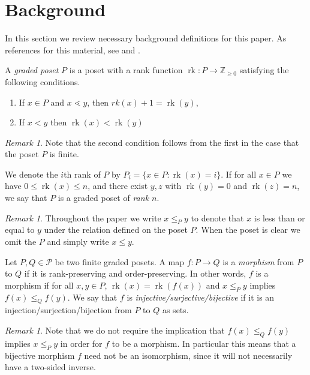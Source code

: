 \documentclass[smallextended, envcountsame, numbook]{svjour3}
\theoremstyle{plain}
\theoremstyle{definition}
\theoremstyle{remark}
\newtheorem{rmk}[thm]{Remark}
\numberwithin{equation}{section}
\newcommand\rk{\operatorname{rk}}
\begin{document}
\section{Background}\label{sec:background}

In this section we review necessary background definitions for this paper.
As references for this material, see
\cite[Chapter 4]{stanley_alg_comb} and \cite{quotients_stanley}.


A {\it graded poset} $P$ is a poset with a rank function $\rk\colon P \rightarrow \mathbb Z_{\geq 0}$ satisfying the following conditions.
\begin{enumerate}
  \item If $x\in P$ and $x\lessdot y$, then $rk(x) + 1 = \rk(y)$,
  \item If $x < y$ then $\rk(x) < \rk(y)$ 
\end{enumerate}

\begin{rmk}
Note that the second condition follows from the first in the case that the poset $P$ is finite.
\end{rmk}

We denote the $i$th rank of $P$ by  $P_i = \{x \in P\colon\rk(x) = i\}$.  If for all $x\in P$ we have $0 \leq \rk(x) \leq n$, and there exist $y,z$ with $\rk(y) = 0$ and $\rk(z) = n$, we say that $P$ is a graded poset of {\it rank $n$}.

\begin{rmk}
Throughout the paper we write $x\le_P y$ to denote that $x$ is less than or equal to $y$ under the relation defined on the poset $P$.  When the poset is clear we omit the $P$ and simply write $x\le y$.  
\end{rmk}
Let $P, Q \in \mathcal P$ be two finite graded posets.  A map $f\colon P\rightarrow Q$ is a \textit{morphism} from $P$ to $Q$ if it is rank-preserving and order-preserving.  In other words, $f$ is a morphism if for all $x,y\in P$, $\rk(x) = \rk(f(x))$ and $x\le_P y $ implies $f(x)\le_Q f(y)$.  We say that $f$ is \textit{injective/surjective/bijective} if it is an injection/surjection/bijection from $P$ to $Q$ as sets.

\begin{rmk}\label{rem:bijective_morphism_not_isomorphism}
Note that we do not require the implication that $f(x)\le_Q f(y)$ implies $x\le_P y$ in order for $f$ to be a morphism.  In particular this means that a bijective morphism $f$ need not be an isomorphism, since it will not necessarily have a two-sided inverse.  
\end{rmk}
\end{document}
